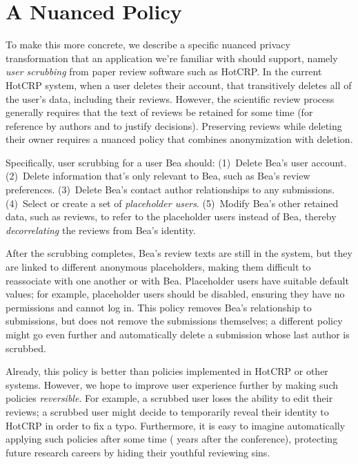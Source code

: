 \section{A Nuanced Policy}
\label{design:eg}


To make this more concrete, we describe a specific nuanced privacy
transformation that an application we're familiar with should support, namely
\emph{user scrubbing} from paper review software such as HotCRP.
%
In the current HotCRP system, when a user deletes their account, that
transitively deletes all of the user's data, including their reviews.
%
However, the scientific review process generally requires that the text of
reviews be retained for some time (for reference by authors and to justify
decisions).
%
Preserving reviews while deleting their owner requires a nuanced policy
that combines anonymization with deletion.


Specifically, user scrubbing for a user Bea should:
%
(1)~Delete Bea's user account.
%
(2)~Delete information that's only relevant to Bea, such as Bea's review
preferences.
%
(3)~Delete Bea's contact author relationships to any submissions.
%
(4)~Select or create a set of \emph{placeholder users}.
%
(5)~Modify Bea's other retained data, such as reviews, to refer to the
placeholder users instead of Bea, thereby \emph{decorrelating} the reviews from Bea's identity.


After the scrubbing completes, Bea's review texts are still in the system, but
they are linked to different anonymous placeholders, making them difficult to
reassociate with one another or with Bea.
%
Placeholder users have suitable default values; for example, placeholder
users should be disabled,
ensuring they have no permissions and cannot log in.
%
This policy removes Bea's relationship to submissions, but does not remove the
submissions themselves; a different policy might go even further and
automatically delete a submission whose last author is scrubbed.
%

Already, this policy is better than policies implemented in HotCRP or other systems.
%
However, we hope to improve user experience further by making such policies
\emph{reversible}.
%
For example, a scrubbed user loses the ability to edit their reviews; a
scrubbed user might decide to temporarily reveal their identity to HotCRP in
order to fix a typo.
%
Furthermore, it is easy to imagine automatically applying such policies
after some time ( years after the conference), protecting future
research careers by hiding their youthful reviewing sins.
%

